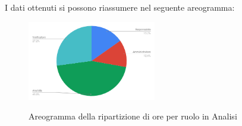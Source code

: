 I dati ottenuti si possono riassumere nel seguente areogramma:
\begin{figure}[H] 
			\centering 
				\includegraphics[width=0.5\textwidth]{res/images/areogramma_analisi.png}\\
				\caption{Areogramma della ripartizione di ore per ruolo in Analisi}
			\label{AreogrammaAnalisi}
\end{figure}

